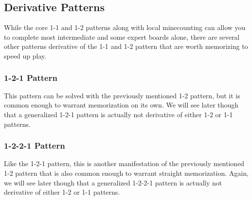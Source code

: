 \subsection{Derivative Patterns}
While the core 1-1 and 1-2 patterns along with local minecounting can allow you to complete most intermediate and some expert boards alone, there are several other patterns derivative of the 1-1 and 1-2 pattern that are worth memorizing to speed up play.\\

\subsubsection*{1-2-1 Pattern}
This pattern can be solved with the previously mentioned 1-2 pattern, but it is common enough to warrant memorization on its own. We will see later though that a generalized 1-2-1 pattern is actually not derivative of either 1-2 or 1-1 patterns.


\subsubsection*{1-2-2-1 Pattern}
Like the 1-2-1 pattern, this is another manifestation of the previously mentioned 1-2 pattern that is also common enough to warrant straight memorization. Again, we will see later though that a generalized 1-2-2-1 pattern is actually not derivative of either 1-2 or 1-1 patterns.\\



